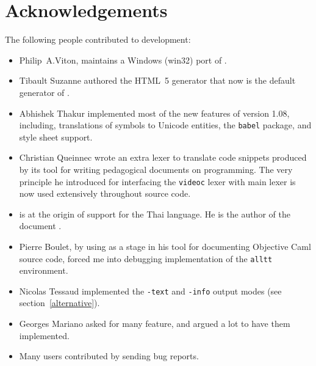 \section{Acknowledgements}
The following people contributed to \hevea{} development:
\begin{itemize}
\item Philip~A.Viton, maintains a
{Windows (win32) port} of \hevea.
\item Tibault Suzanne authored the HTML~5 generator that now is
the default generator of \hevea.
\item Abhishek Thakur implemented most of the new features of version
1.08, including, translations of symbols to Unicode entities,
the  \texttt{babel} package, and style sheet support.
\item Christian Queinnec wrote an extra lexer to translate code
snippets produced by its tool
for writing pedagogical documents on programming.
The very principle he introduced for interfacing the \texttt{videoc}
lexer with \hevea{} main lexer is now used extensively throughout
\hevea{} source code.
\item {}
is at the origin of support for the Thai language. He is
the author of the document .
\item Pierre Boulet, by using \hevea{} as a stage in his tool
for documenting Objective Caml source code, forced me into debugging
\hevea{} implementation of the \verb+alltt+ environment.
\item Nicolas Tessaud implemented the \verb+-text+ and \verb+-info+
output modes (see section~\ref{alternative}).
\item Georges Mariano asked for
many feature, and argued a lot to have them implemented.
\item Many users contributed by sending bug reports.
\end{itemize}

